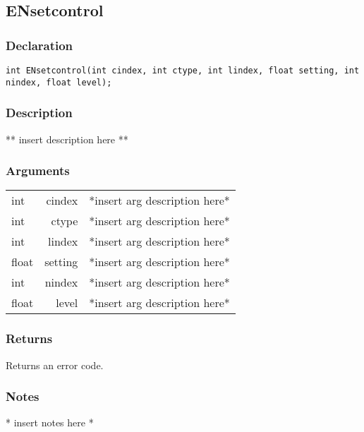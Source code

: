 \subsection{ENsetcontrol}
\subsubsection{Declaration}
\begin{lstlisting}
int ENsetcontrol(int cindex, int ctype, int lindex, float setting, int nindex, float level);
\end{lstlisting}
\subsubsection{Description}
** insert description here **
\subsubsection{Arguments}
\begin{tabular}{l r p{11cm} }
int&cindex&*insert arg description here* \\[6pt]
int&ctype&*insert arg description here* \\[6pt]
int&lindex&*insert arg description here* \\[6pt]
float&setting&*insert arg description here* \\[6pt]
int&nindex&*insert arg description here* \\[6pt]
float&level&*insert arg description here* \\[6pt]
\end{tabular}
\subsubsection{Returns}
Returns an error code.
\subsubsection{Notes}
* insert notes here *